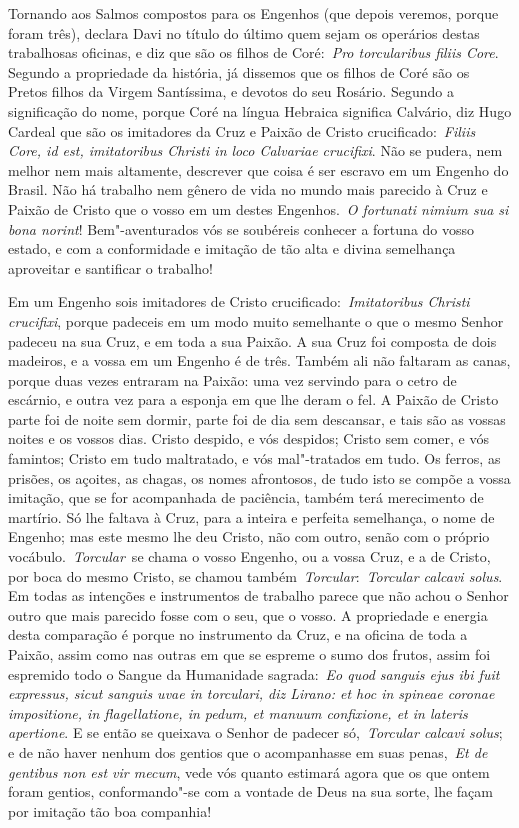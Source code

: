 Tornando aos Salmos compostos para os Engenhos (que depois
veremos, porque foram três), declara Davi no título do último quem
sejam os operários destas trabalhosas oficinas, e diz que são os filhos
de Coré:~\emph{Pro torcularibus filiis Core}. Segundo a propriedade da
história, já dissemos que os filhos de Coré são os Pretos filhos da
Virgem Santíssima, e devotos do seu Rosário. Segundo a significação do
nome, porque Coré na língua Hebraica significa Calvário, diz Hugo
Cardeal que são os imitadores da Cruz e Paixão de Cristo
crucificado:~\emph{Filiis Core, id est, imitatoribus Christi in loco
Calvariae crucifixi}. Não se pudera, nem melhor nem mais altamente,
descrever que coisa é ser escravo em um Engenho do Brasil. Não há
trabalho nem gênero de vida no mundo mais parecido à Cruz e Paixão de
Cristo que o vosso em um destes Engenhos.~\emph{O fortunati nimium sua
si bona norint}! Bem"-aventurados vós se soubéreis conhecer a fortuna do
vosso estado, e com a conformidade e imitação de tão alta e divina
semelhança aproveitar e santificar o trabalho!

Em um Engenho sois imitadores de Cristo
crucificado:~\emph{Imitatoribus Christi crucifixi}, porque padeceis em
um modo muito semelhante o que o mesmo Senhor padeceu na sua Cruz, e em
toda a sua Paixão. A sua Cruz foi composta de dois madeiros, e a vossa
em um Engenho é de três. Também ali não faltaram as canas, porque duas
vezes entraram na Paixão: uma vez servindo para o cetro de escárnio, e
outra vez para a esponja em que lhe deram o fel. A Paixão de Cristo
parte foi de noite sem dormir, parte foi de dia sem descansar, e tais
são as vossas noites e os vossos dias. Cristo despido, e vós despidos;
Cristo sem comer, e vós famintos; Cristo em tudo maltratado, e vós
mal"-tratados em tudo. Os ferros, as prisões, os açoites, as chagas, os
nomes afrontosos, de tudo isto se compõe a vossa imitação, que se for
acompanhada de paciência, também terá merecimento de martírio. Só lhe
faltava à Cruz, para a inteira e perfeita semelhança, o nome de Engenho;
mas este mesmo lhe deu Cristo, não com outro, senão com o próprio
vocábulo.~\emph{Torcular}~se chama o vosso Engenho, ou a vossa Cruz, e a
de Cristo, por boca do mesmo Cristo, se chamou
também~\emph{Torcular}:~\emph{Torcular calcavi solus}.
Em todas as intenções e instrumentos de trabalho parece que não achou o
Senhor outro que mais parecido fosse com o seu, que o vosso. A
propriedade e energia desta comparação é porque no instrumento da Cruz,
e na oficina de toda a Paixão, assim como nas outras em que se espreme o
sumo dos frutos, assim foi espremido todo o Sangue da Humanidade
sagrada:~\emph{Eo quod sanguis ejus ibi fuit expressus, sicut sanguis
uvae in torculari, diz Lirano: et hoc in spineae coronae impositione, in
flagellatione, in pedum, et manuum confixione, et in lateris apertione}.
E se então se queixava o Senhor de padecer só,~\emph{Torcular calcavi
solus}; e de não haver nenhum dos gentios que o acompanhasse em suas
penas,~\emph{Et de gentibus non est vir mecum}, vede
vós quanto estimará agora que os que ontem foram gentios, conformando"-se
com a vontade de Deus na sua sorte, lhe façam por imitação tão boa
companhia!


